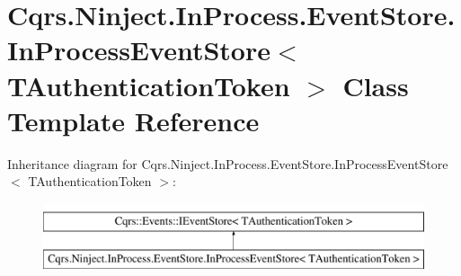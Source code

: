 \hypertarget{classCqrs_1_1Ninject_1_1InProcess_1_1EventStore_1_1InProcessEventStore}{}\section{Cqrs.\+Ninject.\+In\+Process.\+Event\+Store.\+In\+Process\+Event\+Store$<$ T\+Authentication\+Token $>$ Class Template Reference}
\label{classCqrs_1_1Ninject_1_1InProcess_1_1EventStore_1_1InProcessEventStore}
Inheritance diagram for Cqrs.\+Ninject.\+In\+Process.\+Event\+Store.\+In\+Process\+Event\+Store$<$ T\+Authentication\+Token $>$\+:\begin{figure}[H]
\begin{center}
\leavevmode
\includegraphics[height=2.000000cm]{classCqrs_1_1Ninject_1_1InProcess_1_1EventStore_1_1InProcessEventStore}
\end{center}
\end{figure}
